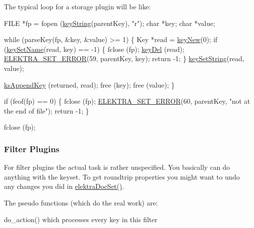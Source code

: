 The typical loop for a storage plugin will be like\-:


\begin{DoxyCodeInclude}
        FILE *fp = fopen (\hyperlink{group__keyvalue_ga880936f2481d28e6e2acbe7486a21d05}{keyString}(parentKey), \textcolor{stringliteral}{"r"});
        \textcolor{keywordtype}{char} *key;
        \textcolor{keywordtype}{char} *value;

        \textcolor{keywordflow}{while} (parseKey(fp, &key, &value) >= 1)
        \{
                Key *read = \hyperlink{group__key_gad23c65b44bf48d773759e1f9a4d43b89}{keyNew}(0);
                \textcolor{keywordflow}{if} (\hyperlink{group__keyname_ga7699091610e7f3f43d2949514a4b35d9}{keySetName}(read, key) == -1)
                \{
                        fclose (fp);
                        \hyperlink{group__key_ga3df95bbc2494e3e6703ece5639be5bb1}{keyDel} (read);
                        \hyperlink{group__plugin_gaab1842b82272e6d4235b6a71587a64d9}{ELEKTRA\_SET\_ERROR}(59, parentKey, key);
                        \textcolor{keywordflow}{return} -1;
                \}
                \hyperlink{group__keyvalue_ga622bde1eb0e0c4994728331326340ef2}{keySetString}(read, value);

                \hyperlink{group__keyset_gaa5a1d467a4d71041edce68ea7748ce45}{ksAppendKey} (returned, read);
                free (key);
                free (value);
        \}

        \textcolor{keywordflow}{if} (feof(fp) == 0)
        \{
                fclose (fp);
                \hyperlink{group__plugin_gaab1842b82272e6d4235b6a71587a64d9}{ELEKTRA\_SET\_ERROR}(60, parentKey, \textcolor{stringliteral}{"not at the
       end of file"});
                \textcolor{keywordflow}{return} -1;
        \}

        fclose (fp);
\end{DoxyCodeInclude}
 \hypertarget{group__plugin_filter}{}\subsubsection{Filter Plugins}\label{group__plugin_filter}
For filter plugins the actual task is rather unspecified. You basically can do anything with the keyset. To get roundtrip properties you might want to undo any changes you did in \hyperlink{group__plugin_gae65781a1deb34efc79c8cb9d9174842c}{elektra\-Doc\-Set()}.

The pseudo functions (which do the real work) are\-:
\begin{DoxyItemize}
\item do\-\_\-action() which processes every key in this filter
\end{DoxyItemize}



